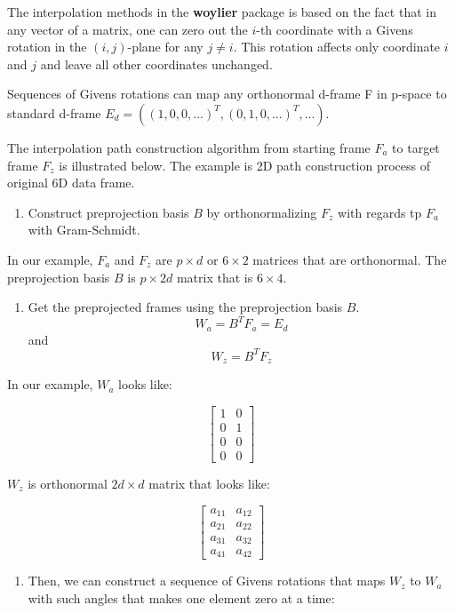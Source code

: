 The interpolation methods in the \textbf{woylier} package is based on the fact that in any vector of a matrix, one can zero out the \(i\)-th coordinate with a Givens rotation in the \((i, j)\)-plane for any \(j\neq i\). This rotation affects only coordinate \(i\) and \(j\) and leave all other coordinates unchanged.

Sequences of Givens rotations can map any orthonormal d-frame F in p-space to standard d-frame \(E_d=((1, 0, 0, ...)^T, (0, 1, 0, ...)^T, ...)\).

The interpolation path construction algorithm from starting frame \(F_a\) to target frame \(F_z\) is illustrated below. The example is 2D path construction process of original 6D data frame.

\begin{enumerate}
\def\labelenumi{\arabic{enumi}.}
\tightlist
\item
  Construct preprojection basis \(B\) by orthonormalizing \(F_z\) with regards tp \(F_a\) with Gram-Schmidt.
\end{enumerate}

In our example, \(F_a\) and \(F_z\) are \(p\times d\) or \(6\times2\) matrices that are orthonormal. The preprojection basis \(B\) is \(p\times 2d\) matrix that is \(6\times 4\).

\begin{enumerate}
\def\labelenumi{\arabic{enumi}.}
\setcounter{enumi}{1}
\tightlist
\item
  Get the preprojected frames using the preprojection basis \(B\).
  \[W_a = B^TF_a = E_d\] and \[W_z = B^TF_z\]
\end{enumerate}

In our example, \(W_a\) looks like:

\[ \begin{bmatrix}1 & 0 \\0  &1 \\ 0&0 \\0&0\end{bmatrix} \]

\(W_z\) is orthonormal \(2d\times d\) matrix that looks like:

\[ \begin{bmatrix} a_{11} & a_{12} \\a_{21}  &a_{22} \\ a_{31}&a_{32} \\a_{41}&a_{42}\end{bmatrix} \]

\begin{enumerate}
\def\labelenumi{\arabic{enumi}.}
\setcounter{enumi}{2}
\tightlist
\item
  Then, we can construct a sequence of Givens rotations that maps \(W_z\) to \(W_a\) with such angles that makes one element zero at a time:
\end{enumerate}

